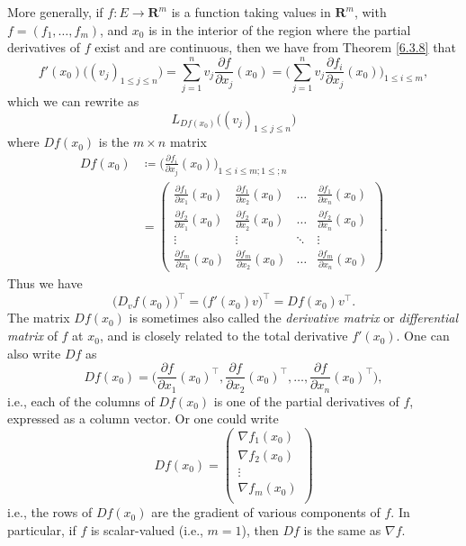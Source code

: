 \begin{additional corollary}\label{ac 6.3.4}
More generally, if \(f : E \to \mathbf{R}^m\) is a function taking values in \(\mathbf{R}^m\), with \(f = (f_1, \dots, f_m)\), and \(x_0\) is in the interior of the region where the partial derivatives of \(f\) exist and are continuous, then we have from Theorem \ref{6.3.8} that
\[
    f'(x_0)\big((v_j)_{1 \leq j \leq n}\big) = \sum_{j = 1}^n v_j \frac{\partial f}{\partial x_j}(x_0) = \bigg(\sum_{j = 1}^n v_j \frac{\partial f_i}{\partial x_j}(x_0)\bigg)_{1 \leq i \leq m},
\]
which we can rewrite as
\[
    L_{D f(x_0)}\big((v_j)_{1 \leq j \leq n}\big)
\]
where \(D f(x_0)\) is the \(m \times n\) matrix
\begin{align*}
    D f(x_0) & \coloneqq \bigg(\frac{\partial f_i}{\partial x_j}(x_0)\bigg)_{1 \leq i \leq m ; 1 \leq ; n} \\
             & = \begin{pmatrix}
        \frac{\partial f_1}{\partial x_1}(x_0) & \frac{\partial f_1}{\partial x_2}(x_0) & \dots  & \frac{\partial f_1}{\partial x_n}(x_0) \\
        \frac{\partial f_2}{\partial x_1}(x_0) & \frac{\partial f_2}{\partial x_2}(x_0) & \dots  & \frac{\partial f_2}{\partial x_n}(x_0) \\
        \vdots                                 & \vdots                                 & \ddots & \vdots                                 \\
        \frac{\partial f_m}{\partial x_1}(x_0) & \frac{\partial f_m}{\partial x_2}(x_0) & \dots  & \frac{\partial f_m}{\partial x_n}(x_0)
    \end{pmatrix}.
\end{align*}
Thus we have
\[
    \big(D_v f(x_0)\big)^\top = \big(f'(x_0) v\big)^\top = D f(x_0) v^\top.
\]
The matrix \(D f(x_0)\) is sometimes also called the \emph{derivative matrix} or \emph{differential matrix} of \(f\) at \(x_0\), and is closely related to the total derivative \(f'(x_0)\).
One can also write \(Df\) as
\[
    D f(x_0) = \bigg(\frac{\partial f}{\partial x_1}(x_0)^\top, \frac{\partial f}{\partial x_2}(x_0)^\top, \dots, \frac{\partial f}{\partial x_n}(x_0)^\top\bigg),
\]
i.e., each of the columns of \(D f(x_0)\) is one of the partial derivatives of \(f\), expressed as a column vector.
Or one could write
\[
    D f(x_0) = \begin{pmatrix}
        \nabla f_1(x_0) \\
        \nabla f_2(x_0) \\
        \vdots          \\
        \nabla f_m(x_0) \\
    \end{pmatrix}
\]
i.e., the rows of \(D f(x_0)\) are the gradient of various components of \(f\).
In particular, if \(f\) is scalar-valued (i.e., \(m = 1\)), then \(Df\) is the same as \(\nabla f\).
\end{additional corollary}

